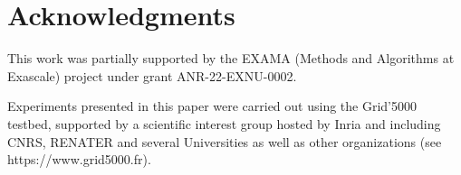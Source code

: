 \section*{Acknowledgments}
This work was partially supported by the EXAMA (Methods and Algorithms at Exascale) project under grant ANR-22-EXNU-0002.


Experiments presented in this paper were carried out using the Grid'5000 testbed, supported by a scientific interest group hosted by Inria and including CNRS, RENATER and several Universities as well as other organizations (see https://www.grid5000.fr).